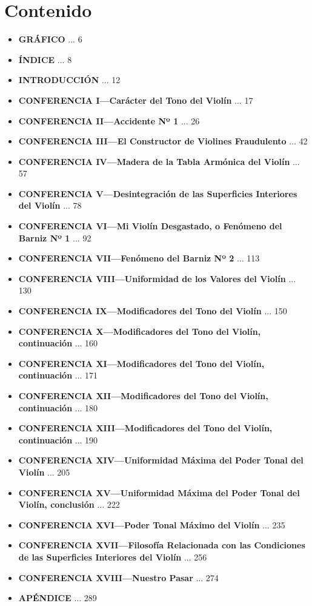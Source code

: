 \documentclass[12pt]{book}
\begin{document}
\chapter*{Contenido}

\begin{itemize}
    \item \textbf{GRÁFICO} ... 6
    \item \textbf{ÍNDICE} ... 8
    \item \textbf{INTRODUCCIÓN} ... 12
    \item \textbf{CONFERENCIA I—Carácter del Tono del Violín} ... 17
    \item \textbf{CONFERENCIA II—Accidente Nº 1} ... 26
    \item \textbf{CONFERENCIA III—El Constructor de Violines Fraudulento} ... 42
    \item \textbf{CONFERENCIA IV—Madera de la Tabla Armónica del Violín} ... 57
    \item \textbf{CONFERENCIA V—Desintegración de las Superficies Interiores del Violín} ... 78
    \item \textbf{CONFERENCIA VI—Mi Violín Desgastado, o Fenómeno del Barniz Nº 1} ... 92
    \item \textbf{CONFERENCIA VII—Fenómeno del Barniz Nº 2} ... 113
    \item \textbf{CONFERENCIA VIII—Uniformidad de los Valores del Violín} ... 130
    \item \textbf{CONFERENCIA IX—Modificadores del Tono del Violín} ... 150
    \item \textbf{CONFERENCIA X—Modificadores del Tono del Violín, continuación} ... 160
    \item \textbf{CONFERENCIA XI—Modificadores del Tono del Violín, continuación} ... 171
    \item \textbf{CONFERENCIA XII—Modificadores del Tono del Violín, continuación} ... 180
    \item \textbf{CONFERENCIA XIII—Modificadores del Tono del Violín, continuación} ... 190
    \item \textbf{CONFERENCIA XIV—Uniformidad Máxima del Poder Tonal del Violín} ... 205
    \item \textbf{CONFERENCIA XV—Uniformidad Máxima del Poder Tonal del Violín, conclusión} ... 222
    \item \textbf{CONFERENCIA XVI—Poder Tonal Máximo del Violín} ... 235
    \item \textbf{CONFERENCIA XVII—Filosofía Relacionada con las Condiciones de las Superficies Interiores del Violín} ... 256
    \item \textbf{CONFERENCIA XVIII—Nuestro Pasar} ... 274
    \item \textbf{APÉNDICE} ... 289
\end{itemize}
\end{document}
